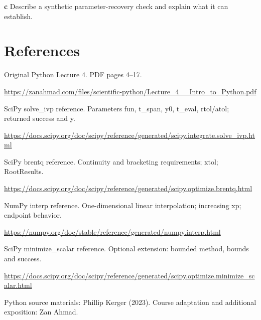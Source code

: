 \documentclass[11pt,letterpaper]{article}
\theoremstyle{definition}\newtheorem{definition}{Definition}\newtheorem{example}{Example}
\numberwithin{equation}{section}
\begin{document}
\textbf{c} Describe a synthetic parameter-recovery check and explain what it can establish.

\section*{References}
\noindent\begin{minipage}{\linewidth}
Original Python Lecture 4. PDF pages 4--17.

\url{https://zanahmad.com/files/scientific-python/Lecture_4__Intro_to_Python.pdf}
\end{minipage}\par\medskip
\noindent\begin{minipage}{\linewidth}
SciPy solve\_ivp reference. Parameters fun, t\_span, y0, t\_eval, rtol/atol; returned success and y.

\url{https://docs.scipy.org/doc/scipy/reference/generated/scipy.integrate.solve_ivp.html}
\end{minipage}\par\medskip
\noindent\begin{minipage}{\linewidth}
SciPy brentq reference. Continuity and bracketing requirements; xtol; RootResults.

\url{https://docs.scipy.org/doc/scipy/reference/generated/scipy.optimize.brentq.html}
\end{minipage}\par\medskip
\noindent\begin{minipage}{\linewidth}
NumPy interp reference. One-dimensional linear interpolation; increasing xp; endpoint behavior.

\url{https://numpy.org/doc/stable/reference/generated/numpy.interp.html}
\end{minipage}\par\medskip
\noindent\begin{minipage}{\linewidth}
SciPy minimize\_scalar reference. Optional extension: bounded method, bounds and success.

\url{https://docs.scipy.org/doc/scipy/reference/generated/scipy.optimize.minimize_scalar.html}
\end{minipage}\par\medskip
Python source materials: Phillip Kerger (2023). Course adaptation and additional exposition: Zan Ahmad.
\end{document}
